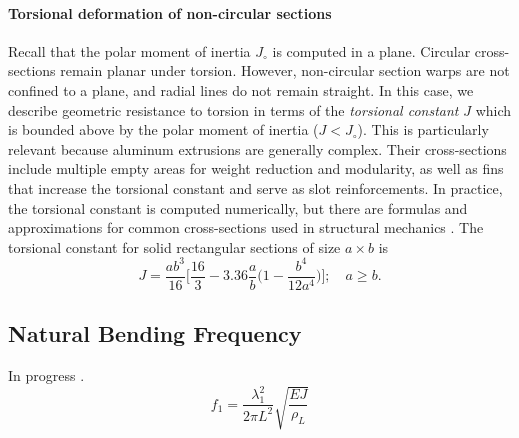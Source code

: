 \paragraph{Torsional deformation of non-circular sections}
Recall that the polar moment of inertia $J_\circ$ is computed in a plane. Circular cross-sections remain planar under torsion. However, non-circular section warps are not confined to a plane, and radial lines do not remain straight. In this case, we describe geometric resistance to torsion in terms of the \textit{torsional constant} $J$ which is bounded above by the polar moment of inertia ($J < J_\circ$). This is particularly relevant because aluminum extrusions are generally complex. Their cross-sections include multiple empty areas for weight reduction and modularity, as well as fins that increase the torsional constant and serve as slot reinforcements. In practice, the torsional constant is computed numerically, but there are formulas and approximations for common cross-sections used in structural mechanics \cite{young2002roark}. The torsional constant for solid rectangular sections of size $a \times b$ is
%
\begin{equation}
    J = \frac{ab^3}{16} \bigg[ \frac{16}{3} - 3.36 \frac{a}{b} \bigg( 1 - \frac{b^4}{12a^4} \bigg) \bigg]; \quad a \geq b.
    \label{eqn:roark_solid_rectangle}
\end{equation}
%
%

\subsection{Natural Bending Frequency}
In progress \cite{blevins2015natural}.
%
\begin{equation}
    f_1 = \frac{\lambda_1^2}{2 \pi L^2} \sqrt{\frac{EJ}{\rho_L}}
    \label{eqn:natural_frequency}
\end{equation}



